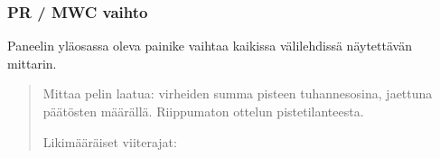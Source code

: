 \documentclass[letterpaper,10pt,finnish]{sphinxmanual}
\begin{document}
\subsubsection{PR / MWC \sphinxhyphen{}vaihto}
\label{\detokenize{manuel:toggle-pr-mwc}}
\sphinxAtStartPar
Paneelin yläosassa oleva  \sphinxhyphen{}painike vaihtaa kaikissa välilehdissä näytettävän mittarin.

\sphinxAtStartPar
{}
\begin{quote}

\sphinxAtStartPar
Mittaa  \sphinxhyphen{}pelin laatua: virheiden summa pisteen tuhannesosina, jaettuna päätösten määrällä. Riippumaton ottelun pistetilanteesta.

\sphinxAtStartPar
Likimääräiset viiterajat:



\end{quote}
\end{document}

